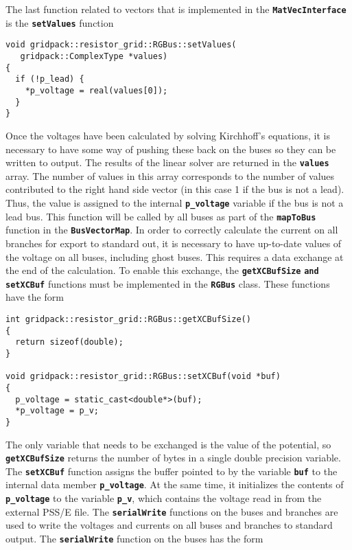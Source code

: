 The last function related to vectors that is implemented in the \texttt{\textbf{MatVecInterface}} is the \texttt{\textbf{setValues}} function

{
\color{red}
\begin{Verbatim}[fontseries=b]
void gridpack::resistor_grid::RGBus::setValues(
   gridpack::ComplexType *values)
{
  if (!p_lead) { 
    *p_voltage = real(values[0]);
  }
}
\end{Verbatim}
}

Once the voltages have been calculated by solving Kirchhoff's equations, it is necessary to have some way of pushing these back on the buses so they can be written to output. The results of the linear solver are returned in the \texttt{\textbf{values}} array. The number of values in this array corresponds to the number of values contributed to the right hand side vector (in this case 1 if the bus is not a lead). Thus, the value is assigned to the internal \texttt{\textbf{p\_voltage}} variable if the bus is not a lead bus. This function will be called by all buses as part of the \texttt{\textbf{mapToBus}} function in the \texttt{\textbf{BusVectorMap}}.
In order to correctly calculate the current on all branches for export to standard out, it is necessary to have up-to-date values of the voltage on all buses, including ghost buses. This requires a data exchange at the end of the calculation. To enable this exchange, the \texttt{\textbf{getXCBufSize}} \texttt{\textbf{and setXCBuf}} functions must be implemented in the \texttt{\textbf{RGBus}} class. These functions have the form

{
\color{red}
\begin{Verbatim}[fontseries=b]
int gridpack::resistor_grid::RGBus::getXCBufSize()
{
  return sizeof(double);
}

void gridpack::resistor_grid::RGBus::setXCBuf(void *buf)
{
  p_voltage = static_cast<double*>(buf);
  *p_voltage = p_v;
}
\end{Verbatim}
}

The only variable that needs to be exchanged is the value of the potential, so \texttt{\textbf{getXCBufSize}} returns the number of bytes in a single double precision variable. The \texttt{\textbf{setXCBuf}} function assigns the buffer pointed to by the variable \texttt{\textbf{buf}} to the internal data member \texttt{\textbf{p\_voltage}}. At the same time, it initializes the contents of \texttt{\textbf{p\_voltage}} to the variable \texttt{\textbf{p\_v}}, which contains the voltage read in from the external PSS/E file.
The \texttt{\textbf{serialWrite}} functions on the buses and branches are used to write the voltages and currents on all buses and branches to standard output. The \texttt{\textbf{serialWrite}} function on the buses has the form


